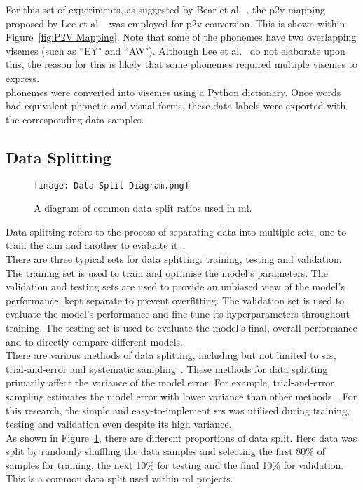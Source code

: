 For this set of experiments, as suggested by Bear et al.~\cite{phoneme_viseme_mapping_review}, the \acrshort{p2v} mapping proposed by Lee et al.~\cite{best_phoneme_viseme_mapping} was employed for \acrshort{p2v} conversion. This is shown within Figure~\ref{fig:P2V Mapping}. Note that some of the \gls{phoneme}s have two overlapping \gls{viseme}s (such as ``EY" and ``AW"). Although Lee et al.~\cite{best_phoneme_viseme_mapping} do not elaborate upon this, the reason for this is likely that some \gls{phoneme}s required multiple \gls{viseme}s to express.\\
\Gls{phoneme}s were converted into \gls{viseme}s using a Python dictionary. Once words had equivalent phonetic and visual forms, these data labels were exported with the corresponding data samples.
\subsection{Data Splitting}
\label{sec: Data Splitting}
\begin{figure}
\centering
\texttt{[image: Data Split Diagram.png]}
\caption[A diagram of some common data split ratios used in \acrfull{ml}.]{A diagram of common data split ratios used in \acrfull{ml}.}
\label{fig:Data Split}
\end{figure}
Data splitting refers to the process of separating data into multiple sets, one to train the \acrshort{ann} and another to evaluate it~\cite{Data-Splitting_2}.\\
There are three typical sets for data splitting: training, testing and validation. The training set is used to train and optimise the model's parameters. The validation and testing sets are used to provide an unbiased view of the model's performance, kept separate to prevent \gls{overfitting}. The validation set is used to evaluate the model's performance and fine-tune its hyperparameters throughout training. The testing set is used to evaluate the model's final, overall performance and to directly compare different models.\\
There are various methods of data splitting, including but not limited to \acrfull{srs}, trial-and-error and systematic sampling~\cite{Data-Splitting}. These methods for data splitting primarily affect the variance of the model error. For example, trial-and-error sampling estimates the model error with lower variance than other methods~\cite{Data-Splitting}. For this research, the simple and easy-to-implement \acrshort{srs} was utilised during training, testing and validation even despite its high variance.\\
As shown in Figure~\ref{fig:Data Split}, there are different proportions of data split. Here data was split by randomly shuffling the data samples and selecting the first 80\% of samples for training, the next 10\% for testing and the final 10\% for validation. This is a common data split used within \acrshort{ml} projects.
